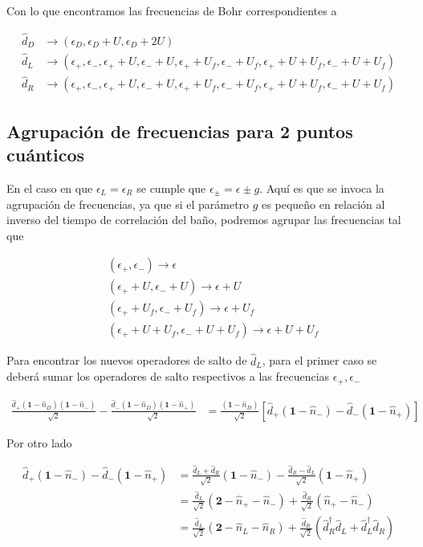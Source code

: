 \begin{appendixs}
Con lo que encontramos las frecuencias de Bohr correspondientes a

\begin{align*}
    \hat{d}_{D} & \to (\epsilon_{D}, \epsilon_{D}+U,\epsilon_{D}+2U) \\
    \hat{d}_{L} & \to (\epsilon_{+},\epsilon_{-},\epsilon_{+}+U,\epsilon_{-}+U,\epsilon_{+}+U_{f},\epsilon_{-}+U_{f},\epsilon_{+}+U+U_{f},\epsilon_{-}+U+U_{f}) \\
    \hat{d}_{R} & \to (\epsilon_{+},\epsilon_{-},\epsilon_{+}+U,\epsilon_{-}+U,\epsilon_{+}+U_{f},\epsilon_{-}+U_{f},\epsilon_{+}+U+U_{f},\epsilon_{-}+U+U_{f})
\end{align*}

\label{apendix5jumpop}

\subsection{Agrupación de frecuencias para 2 puntos cuánticos}
En el caso en que $\epsilon_{L} = \epsilon_{R}$ se cumple que $\epsilon_{\pm} = \epsilon \pm g$. Aquí es que se invoca la agrupación de frecuencias, ya que si el parámetro $g$ es pequeño en relación al inverso del tiempo de correlación del baño, podremos agrupar las frecuencias tal que

\begin{align*}
    &(\epsilon_{+},\epsilon_{-})  \to \epsilon \\
    &(\epsilon_{+}+U,\epsilon_{-}+U)  \to \epsilon+U \\
    &(\epsilon_{+}+U_{f},\epsilon_{-}+U_{f})  \to \epsilon+U_{f} \\
    &(\epsilon_{+}+U+U_{f},\epsilon_{-}+U+U_{f})  \to \epsilon+U+U_{f} 
\end{align*}

Para encontrar los nuevos operadores de salto de $\hat{d}_{L}$, para el primer caso se deberá sumar los operadores de salto respectivos a las frecuencias $\epsilon_{+},\epsilon_{-}$ 

\begin{align*}
    \frac{\hat{d}_{+}(\textbf{1}-\hat{n}_{D})(\textbf{1}-\hat{n}_{-})}{\sqrt{2}} - \frac{\hat{d}_{-}(\textbf{1}-\hat{n}_{D})(\textbf{1}-\hat{n}_{+})}{\sqrt{2}} & = \frac{(\textbf{1}-\hat{n}_{D})}{\sqrt{2}} [\hat{d}_{+}(\textbf{1}-\hat{n}_{-}) - \hat{d}_{-}(\textbf{1}-\hat{n}_{+}) ]
\end{align*}

Por otro lado

\begin{align*}
    \hat{d}_{+}(\textbf{1}-\hat{n}_{-}) - \hat{d}_{-}(\textbf{1}-\hat{n}_{+}) & = \frac{\hat{d}_{L} + \hat{d}_{R}}{\sqrt{2}} (\textbf{1} - \hat{n}_{-}) - \frac{\hat{d}_{R} - \hat{d}_{L}}{\sqrt{2}}(\textbf{1}-\hat{n}_{+}) \\
    & = \frac{\hat{d}_{L}}{\sqrt{2}}(\textbf{2} - \hat{n}_{+} -\hat{n}_{-} ) + \frac{\hat{d}_{R}}{\sqrt{2}}(\hat{n}_{+} -\hat{n}_{-}) \\
    & = \frac{\hat{d}_{L}}{\sqrt{2}}(\textbf{2}-\hat{n}_{L} -\hat{n}_{R}) + \frac{\hat{d}_{R}}{\sqrt{2}}(\hat{d}^{\dagger}_{R}\hat{d}_{L}+\hat{d}^{\dagger}_{L}\hat{d}_{R})
\end{align*}


\end{appendixs}
